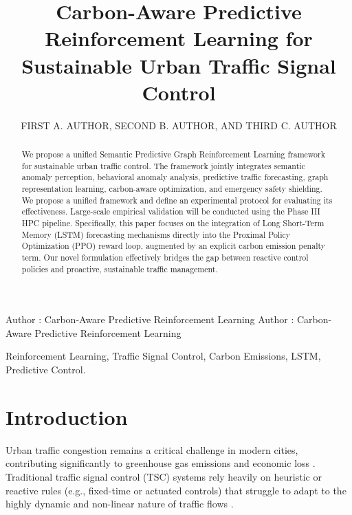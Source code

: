 \documentclass{ieeeaccess}
\begin{document}

\title{Carbon-Aware Predictive Reinforcement Learning for Sustainable Urban Traffic Signal Control}
\author{\uppercase{First A. Author},
\uppercase{Second B. Author, and Third C. Author}}
\address[1]{Department of Computer Science, University of Technology, City, Country}

\markboth
{Author \headeretal: Carbon-Aware Predictive Reinforcement Learning}
{Author \headeretal: Carbon-Aware Predictive Reinforcement Learning}


\begin{abstract}
We propose a unified Semantic Predictive Graph Reinforcement Learning framework for sustainable urban traffic control. The framework jointly integrates semantic anomaly perception, behavioral anomaly analysis, predictive traffic forecasting, graph representation learning, carbon-aware optimization, and emergency safety shielding. We propose a unified framework and define an experimental protocol for evaluating its effectiveness. Large-scale empirical validation will be conducted using the Phase III HPC pipeline. Specifically, this paper focuses on the integration of Long Short-Term Memory (LSTM) forecasting mechanisms directly into the Proximal Policy Optimization (PPO) reward loop, augmented by an explicit carbon emission penalty term. Our novel formulation effectively bridges the gap between reactive control policies and proactive, sustainable traffic management.
\end{abstract}

\begin{keywords}
Reinforcement Learning, Traffic Signal Control, Carbon Emissions, LSTM, Predictive Control.
\end{keywords}

\titlepgskip=-15pt
\maketitle

\section{Introduction}
\label{sec:introduction}
Urban traffic congestion remains a critical challenge in modern cities, contributing significantly to greenhouse gas emissions and economic loss \cite{placeholder1}. Traditional traffic signal control (TSC) systems rely heavily on heuristic or reactive rules (e.g., fixed-time or actuated controls) that struggle to adapt to the highly dynamic and non-linear nature of traffic flows \cite{placeholder2}.
\end{document}
